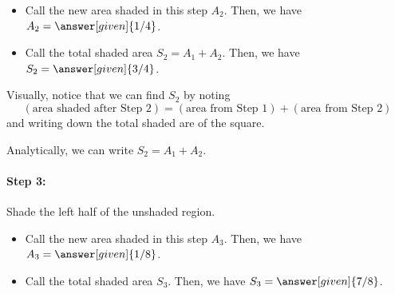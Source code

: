 \documentclass{ximera}
\begin{document}
\begin{example}
\begin{image}[1in]
\end{image}

\begin{itemize}
\item Call the new area shaded in this step $A_2$.  Then, we have $A_2=\answer[given]{1/4}$.
\item Call the total shaded area  $S_2 = A_1 + A_2$.  Then, we have $S_2=\answer[given]{3/4}$.
\end{itemize}

Visually, notice that we can find $S_2$ by noting
$$( \textrm{area shaded after Step } 2) = ( \textrm{area from Step } 1) + (\textrm{area from Step } 2)$$
and writing down the total shaded are of the square.

Analytically, we can write $S_2=A_1+A_2.$

\paragraph{Step 3:} Shade the left half of the unshaded region.  \begin{image}[1in]
\end{image}

\begin{itemize}
\item Call the new area shaded in this step $A_3$.  Then, we have $A_3=\answer[given]{1/8}$.
\item Call the total shaded area $S_3$.  Then, we have $S_3=\answer[given]{7/8}$.
\end{itemize}


\end{example}
\end{document}
